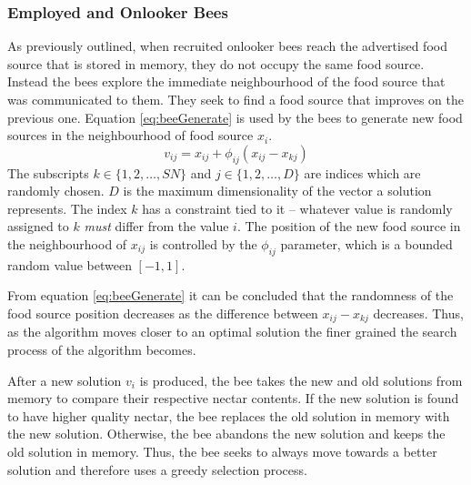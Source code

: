 \subsubsection{Employed and Onlooker Bees}
\label{sec:employonlookerbees}
As previously outlined, when recruited onlooker bees reach the advertised food source that is stored in memory, they do not occupy the same food source\cite{ABCCompareStudy,ABCNumericalOptimization}. Instead the bees explore the immediate neighbourhood of the food source that was communicated to them\cite{BeeJobShop,ABCFusionGrid,ABCReconfigDistro}. They seek to find a food source that improves on the previous one\cite{BeeJobShop,ABCCompareStudy,ABCLeafConstrained,ABCNumericalOptimization}. Equation \ref{eq:beeGenerate} is used by the bees to generate new food sources in the neighbourhood of food source $x_i$\cite{BeeJobShop,ABCCompareStudy,ABCFusionGrid}.
\begin{equation}
\label{eq:beeGenerate}
v_{ij} = x_{ij} + \phi_{ij}(x_{ij} - x_{kj})
\end{equation}
The subscripts $k \in \{1,2,\dots,SN\}$ and $j \in \{1,2,\dots,D\}$ are indices which are randomly chosen. $D$ is the maximum dimensionality of the vector a solution represents. The index $k$ has a constraint tied to it -- whatever value is randomly assigned to $k$ \emph{must} differ from the value $i$. The position of the new food source in the neighbourhood of $x_{ij}$ is controlled by the $\phi_{ij}$ parameter, which is a bounded random value between $[-1,1]$. 

From equation \ref{eq:beeGenerate} it can be concluded that the randomness of the food source position decreases as the difference between $x_{ij} - x_{kj}$ decreases. Thus, as the algorithm moves closer to an optimal solution the finer grained the search process of the algorithm becomes\cite{ABCCompareStudy,ABCNumericalOptimization,ABCImageEnhancement}.

After a new solution $v_i$ is produced, the bee takes the new and old solutions from memory to compare their respective nectar contents. If the new solution is found to have higher quality nectar, the bee replaces the old solution in memory with the new solution\cite{ABCCompareStudy,BeeJobShop,ABCImageEnhancement,ABCReconfigDistro}. Otherwise, the bee abandons the new solution and keeps the old solution in memory\cite{ABCCompareStudy,ABCLeafConstrained,ABCNumericalOptimization}. Thus, the bee seeks to always move towards a better solution and therefore uses a greedy selection process\cite{ABCCompareStudy,ABCLeafConstrained,ABCReconfigDistro}.

